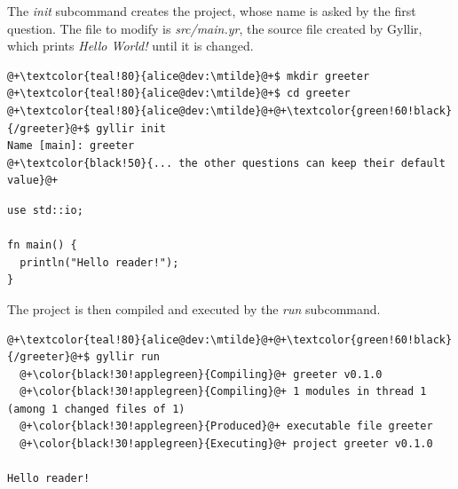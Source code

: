 The \textit{init} subcommand creates the project, whose name is asked by the
first question. The file to modify is \textit{src/main.yr}, the source file
created by Gyllir, which prints \textit{Hello World!} until it is changed.

\begin{lstlisting}[style=bashVerb, escapechar=@+]
@+\textcolor{teal!80}{alice@dev:\mtilde}@+$ mkdir greeter
@+\textcolor{teal!80}{alice@dev:\mtilde}@+$ cd greeter
@+\textcolor{teal!80}{alice@dev:\mtilde}@+@+\textcolor{green!60!black}{/greeter}@+$ gyllir init
Name [main]: greeter
@+\textcolor{black!50}{... the other questions can keep their default value}@+
\end{lstlisting}

\begin{lstlisting}[style=coloredverbatim, caption=Content of \textit{src/main.yr}]
use std::io;

fn main() {
  println("Hello reader!");
}
\end{lstlisting}

The project is then compiled and executed by the \textit{run} subcommand.

\begin{lstlisting}[style=bashVerb, escapechar=@+]
@+\textcolor{teal!80}{alice@dev:\mtilde}@+@+\textcolor{green!60!black}{/greeter}@+$ gyllir run
  @+\color{black!30!applegreen}{Compiling}@+ greeter v0.1.0
  @+\color{black!30!applegreen}{Compiling}@+ 1 modules in thread 1 (among 1 changed files of 1)
  @+\color{black!30!applegreen}{Produced}@+ executable file greeter
  @+\color{black!30!applegreen}{Executing}@+ project greeter v0.1.0

Hello reader!
\end{lstlisting}
